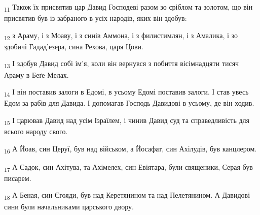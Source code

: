 \begin{tcolorbox}
\textsubscript{11} Також їх присвятив цар Давид Господеві разом зо сріблом та золотом, що він присвятив був із забраного в усіх народів, яких він здобув:
\end{tcolorbox}
\begin{tcolorbox}
\textsubscript{12} з Араму, і з Моаву, і з синів Аммона, і з филистимлян, і з Амалика, і зо здобичі Гадад'езера, сина Рехова, царя Цови.
\end{tcolorbox}
\begin{tcolorbox}
\textsubscript{13} І здобув Давид собі ім'я, коли він вернувся з побиття вісімнадцяти тисяч Араму в Беґе-Мелах.
\end{tcolorbox}
\begin{tcolorbox}
\textsubscript{14} І він поставив залоги в Едомі, в усьому Едомі поставив залоги. І став увесь Едом за рабів для Давида. І допомагав Господь Давидові в усьому, де він ходив.
\end{tcolorbox}
\begin{tcolorbox}
\textsubscript{15} І царював Давид над усім Ізраїлем, і чинив Давид суд та справедливість для всього народу свого.
\end{tcolorbox}
\begin{tcolorbox}
\textsubscript{16} А Йоав, син Церуї, був над військом, а Йосафат, син Ахілудів, був канцлером.
\end{tcolorbox}
\begin{tcolorbox}
\textsubscript{17} А Садок, син Ахітува, та Ахімелех, син Евіятара, були священики, Серая був писарем.
\end{tcolorbox}
\begin{tcolorbox}
\textsubscript{18} А Беная, син Єгояди, був над Керетянином та над Пелетянином. А Давидові сини були начальниками царського двору.
\end{tcolorbox}
